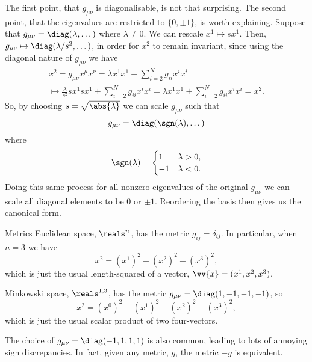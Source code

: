 \documentclass[fleqn]{NotesClass}
\newcommand{\minkowskiSpace}{\reals^{1,3}}
\begin{document}
    The first point, that \(g_{\mu\nu}\) is diagonalisable, is not that surprising.
    The second point, that the eigenvalues are restricted to \(\{0, \pm 1\}\), is worth explaining.
    Suppose that \(g_{\mu\nu} = \diag(\lambda, \dotsc)\) where \(\lambda \ne 0\).
    We can rescale \(x^1 \mapsto sx^1\).
    Then, \(g_{\mu\nu} \mapsto \diag(\lambda/s^2, \dotsc)\), in order for \(x^2\) to remain invariant, since using the diagonal nature of \(g_{\mu\nu}\) we have
    \begin{multline}
        x^2 = g_{\mu\nu}x^\mu x^\nu = \lambda x^1 x^1 + \sum_{i = 2}^{N} g_{ii}x^ix^i\\
        \mapsto \frac{\lambda}{s^2}sx^1sx^1 + \sum_{i = 2}^{N} g_{ii}x^ix^i = \lambda x^1x^1 + \sum_{i = 2}^{N} g_{ii}x^ix^i = x^2.
    \end{multline}
    So, by choosing \(s = \sqrt{\abs{\lambda}}\) we can scale \(g_{\mu\nu}\) such that
    \begin{equation}
        g_{\mu\nu} = \diag(\sgn(\lambda), \dotsc)
    \end{equation}
    where
    \begin{equation}
        \sgn(\lambda) =
        \begin{cases}
            1 & \lambda > 0,\\
            -1 & \lambda < 0.
        \end{cases}
    \end{equation}
    Doing this same process for all nonzero eigenvalues of the original \(g_{\mu\nu}\) we can scale all diagonal elements to be \(0\) or \(\pm 1\).
    Reordering the basis then gives us the canonical form.
    
    \begin{exm}{Metrics}{}
        Euclidean space, \(\reals^n\), has the metric \(g_{ij} = \delta_{ij}\).
        In particular, when \(n = 3\) we have
        \begin{equation}
            x^2 = (x^1)^2 + (x^2)^2 + (x^3)^2,
        \end{equation}
        which is just the usual length-squared of a vector, \(\vv{x} = (x^1, x^2, x^3)\).
        
        Minkowski space, \(\minkowskiSpace\), has the metric \(g_{\mu\nu} = \diag(1, -1, -1, -1)\), so
        \begin{equation}
            x^2 = (x^0)^2 - (x^1)^2 - (x^2)^2 - (x^3)^2,
        \end{equation}
        which is just the usual scalar product of two four-vectors.
        \begin{wrn}
            The choice of \(g_{\mu\nu} = \diag(-1, 1, 1, 1)\) is also common, leading to lots of annoying sign discrepancies.
            In fact, given any metric, \(g\), the metric \(-g\) is equivalent.
        \end{wrn}
    \end{exm}
    
\end{document}
